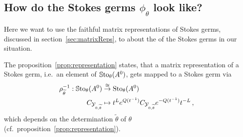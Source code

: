 \subsection{How do the Stokes germs $\phi_\theta$ look like?}
Here we want to use the faithful matrix representations of Stokes germs,
discussed in section~\ref{sec:matrixReps}, to 
about the  of the Stokes germs in our situation.

The proposition~\ref{prop:representation} states, that a matrix representation
of a Stokes germ, i.e.\ an element of $\operatorname{\mathbb{S}to}_\theta(A^0)$, gets mapped to a
Stokes germ via
\begin{align*}
  \rho_{\widetilde\theta}^{-1}:
  \operatorname{\mathbb{S}to}_\theta(A^0)
  &\overset{\cong}\to
  \operatorname{Sto}_\theta(A^0)
  \\C_{\mathcal{Y}_{0,\widetilde\theta}} &\mapsto
  t^{L}e^{Q(t^{-1})}C_{\mathcal{Y}_{0,\widetilde\theta}} e^{-Q(t^{-1})}t^{-L} \,,
\end{align*}
which depends on the determination $\tilde\theta$ of $\theta$ 
(cf.\ proposition~\ref{prop:representation}).

